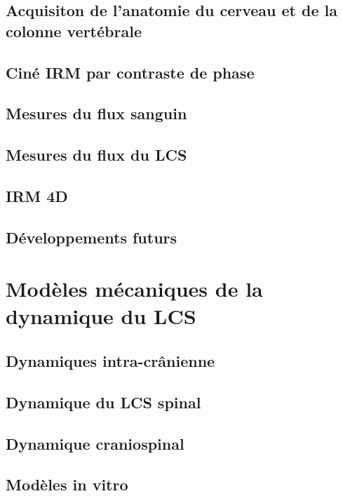 \documentclass{report}
\begin{document}
\subsection{Acquisiton de l'anatomie du cerveau et de la colonne vertébrale}

\subsection{Ciné IRM par contraste de phase}

\subsection{Mesures du flux sanguin}

\subsection{Mesures du flux du LCS}

\subsection{IRM 4D}

\subsection{Développements futurs}

\section{Modèles mécaniques de la dynamique du LCS}

\subsection{Dynamiques intra-crânienne}

\subsection{Dynamique du LCS spinal}

\subsection{Dynamique craniospinal}

\subsection{Modèles in vitro}
\end{document}

